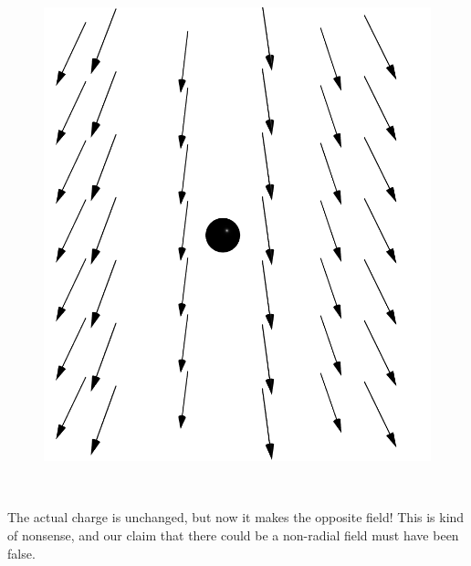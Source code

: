\documentclass{article}
\begin{document}
\begin{minipage}{0.3\textwidth}
\begin{figure}[H]
\centering
\includegraphics[width=\textwidth]{figures/2l3.png}
\end{figure}
\end{minipage}
~
\begin{minipage}{0.6\textwidth}
    The actual charge is unchanged, but now it makes the opposite field! This is kind of nonsense, and our claim that there could be a non-radial field must have been false.
\end{minipage}
\end{document}
